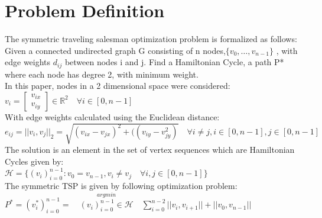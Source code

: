 \documentclass[format=sigconf]{acmart}
\begin{document}
\section{Problem Definition}
The symmetric traveling salesman optimization problem is formalized as follows:\\
Given a connected undirected graph G consisting of n nodes,$\{v_0, \hdots, v_{n-1}\}$ , with edge weights $d_{ij}$ between nodes i and j.
Find a Hamiltonian Cycle, a path P* where each node has degree 2, with minimum weight.\\
In this paper, nodes in a 2 dimensional space were considered: $v_i = \begin{bmatrix}
v_{ix} \\ v_{iy} 
\end{bmatrix} \in \mathbb{R}^2 \quad \forall i \in [0,n-1]$\\
With edge weights calculated using the Euclidean distance: $e_{ij} = || v_i, v_j ||_2 = \sqrt{(v_{ix}-v_{jx})^2 + ((v_{iy}-v_{jy}^2)} \quad \forall i\neq j, i \in [0,n-1], j \in [0,n-1]$\\
The solution is an element in the set of vertex sequences which are Hamiltonian Cycles given by:\\
$\mathcal{H} = \{ (v_i)_{i=0}^{n-1} : v_0 = v_{n-1}, v_i \neq v_j \quad \forall i,j \in [0,n-1]\}$\\
The symmetric TSP is given by following optimization problem:\\ 
$P^*=(v^*_i)_{i=0}^{n-1} =\quad  \stackrel{argmin}{(v_i)_{i=0}^{n-1} \in \mathcal{H}} \quad \sum_{i=0}^{n-2} ||v_i, v_{i+1} || + ||v_0, v_{n-1} || $
\end{document}
